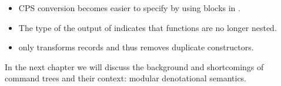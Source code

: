 \begin{itemize}
\item CPS conversion becomes easier to specify by using blocks in .
\item The type of the output of  indicates that functions are no longer nested.
\item {} only transforms records and thus removes duplicate constructors.
\end{itemize}

In the next chapter we will discuss the background and shortcomings of command trees and their context: modular denotational semantics.
